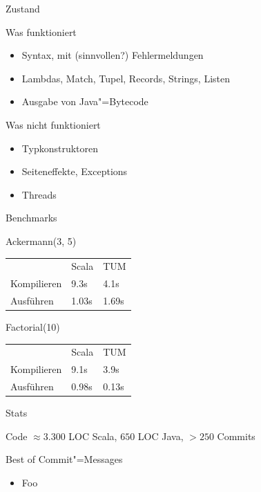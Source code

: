 \documentclass[hyperref={pdfpagelabels=false}]{beamer}
\begin{document}
\begin{frame}{Zustand}
  \begin{exampleblock}{Was funktioniert}
    \begin{itemize}
      \item Syntax, mit (sinnvollen?) Fehlermeldungen
      \item Lambdas, Match, Tupel, Records, Strings, Listen
      \item Ausgabe von Java"=Bytecode
    \end{itemize}
  \end{exampleblock}
  \begin{alertblock}{Was nicht funktioniert}
    \begin{itemize}
      \item Typkonstruktoren
      \item Seiteneffekte, Exceptions
      \item Threads
    \end{itemize}
  \end{alertblock}
\end{frame}

\begin{frame}{Benchmarks}
  \begin{block}{Ackermann(3, 5)}
    \begin{tabular}{l|l|l}
       & Scala & TUM \\
      Kompilieren & 9.3s & 4.1s \\
      Ausführen & 1.03s & 1.69s \\
    \end{tabular}
  \end{block}
  \begin{block}{Factorial(10)}
    \begin{tabular}{l|l|l}
       & Scala & TUM \\
      Kompilieren & 9.1s & 3.9s \\
      Ausführen & 0.98s & 0.13s \\
    \end{tabular}
  \end{block}
\end{frame}

\begin{frame}{Stats}
  \begin{block}{Code}
    $\approx 3.300$ LOC Scala, $650$ LOC Java, $> 250$ Commits
  \end{block}
  \begin{block}{Best of Commit"=Messages}
    \begin{itemize}
      \item Foo
    \end{itemize}
  \end{block}
\end{frame}
\end{document}
